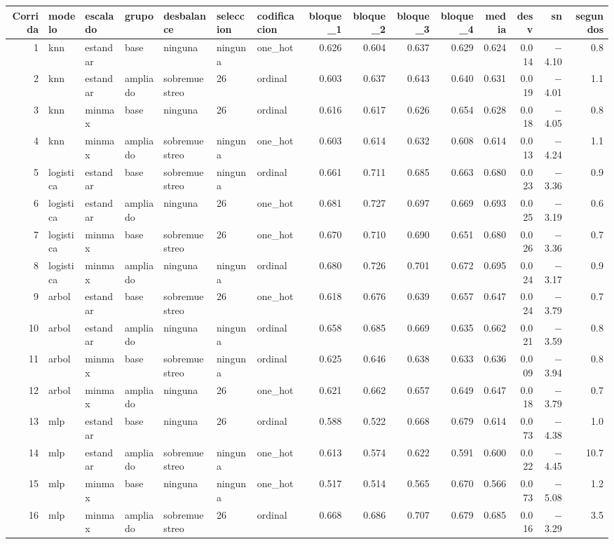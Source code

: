 \begin{tabular}{rllllllrrrrrrrr}
\toprule
Corrida & modelo & escalado & grupo & desbalance & seleccion & codificacion & bloque\_1 & bloque\_2 & bloque\_3 & bloque\_4 & media & desv & sn & segundos \\
\midrule
1 & knn & estandar & base & ninguna & ninguna & one\_hot & 0.626 & 0.604 & 0.637 & 0.629 & 0.624 & 0.014 & $-$4.10 & 0.8 \\
2 & knn & estandar & ampliado & sobremuestreo & 26 & ordinal & 0.603 & 0.637 & 0.643 & 0.640 & 0.631 & 0.019 & $-$4.01 & 1.1 \\
3 & knn & minmax & base & ninguna & 26 & ordinal & 0.616 & 0.617 & 0.626 & 0.654 & 0.628 & 0.018 & $-$4.05 & 0.8 \\
4 & knn & minmax & ampliado & sobremuestreo & ninguna & one\_hot & 0.603 & 0.614 & 0.632 & 0.608 & 0.614 & 0.013 & $-$4.24 & 1.1 \\
5 & logistica & estandar & base & sobremuestreo & ninguna & ordinal & 0.661 & 0.711 & 0.685 & 0.663 & 0.680 & 0.023 & $-$3.36 & 0.9 \\
6 & logistica & estandar & ampliado & ninguna & 26 & one\_hot & 0.681 & 0.727 & 0.697 & 0.669 & 0.693 & 0.025 & $-$3.19 & 0.6 \\
7 & logistica & minmax & base & sobremuestreo & 26 & one\_hot & 0.670 & 0.710 & 0.690 & 0.651 & 0.680 & 0.026 & $-$3.36 & 0.7 \\
8 & logistica & minmax & ampliado & ninguna & ninguna & ordinal & 0.680 & 0.726 & 0.701 & 0.672 & 0.695 & 0.024 & $-$3.17 & 0.9 \\
9 & arbol & estandar & base & sobremuestreo & 26 & one\_hot & 0.618 & 0.676 & 0.639 & 0.657 & 0.647 & 0.024 & $-$3.79 & 0.7 \\
10 & arbol & estandar & ampliado & ninguna & ninguna & ordinal & 0.658 & 0.685 & 0.669 & 0.635 & 0.662 & 0.021 & $-$3.59 & 0.8 \\
11 & arbol & minmax & base & sobremuestreo & ninguna & ordinal & 0.625 & 0.646 & 0.638 & 0.633 & 0.636 & 0.009 & $-$3.94 & 0.8 \\
12 & arbol & minmax & ampliado & ninguna & 26 & one\_hot & 0.621 & 0.662 & 0.657 & 0.649 & 0.647 & 0.018 & $-$3.79 & 0.7 \\
13 & mlp & estandar & base & ninguna & 26 & ordinal & 0.588 & 0.522 & 0.668 & 0.679 & 0.614 & 0.073 & $-$4.38 & 1.0 \\
14 & mlp & estandar & ampliado & sobremuestreo & ninguna & one\_hot & 0.613 & 0.574 & 0.622 & 0.591 & 0.600 & 0.022 & $-$4.45 & 10.7 \\
15 & mlp & minmax & base & ninguna & ninguna & one\_hot & 0.517 & 0.514 & 0.565 & 0.670 & 0.566 & 0.073 & $-$5.08 & 1.2 \\
16 & mlp & minmax & ampliado & sobremuestreo & 26 & ordinal & 0.668 & 0.686 & 0.707 & 0.679 & 0.685 & 0.016 & $-$3.29 & 3.5 \\
\bottomrule
\end{tabular}
